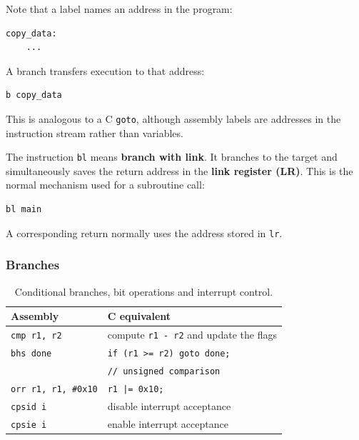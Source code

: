 \documentclass[a4paper,11pt]{article}
\begin{document}
Note that a label names an address in the program:

\begin{lstlisting}[language=arm]
copy_data:
    ...
\end{lstlisting}

A branch transfers execution to that address:

\begin{lstlisting}[language=arm]
b copy_data
\end{lstlisting}

This is analogous to a C \texttt{goto}, although assembly labels are
addresses in the instruction stream rather than variables.

The instruction \texttt{bl} means \textbf{branch with link}. It branches to
the target and simultaneously saves the return address in the
\textbf{link register (LR)}. This is the normal mechanism used for a
subroutine call:

\begin{lstlisting}[language=arm]
bl main
\end{lstlisting}

A corresponding return normally uses the address stored in \texttt{lr}.

\subsubsection{Branches}

\begin{table}[ht]
	\centering
	\begin{tabular}{ll}
		\hline
		Assembly                    & C equivalent                    \\
		\hline
		\texttt{cmp r1, r2}         &
		compute \texttt{r1 - r2} and update the flags                 \\

		\texttt{bhs done}           &
		\texttt{if (r1 >= r2) goto done;}                             \\
		                            & \texttt{// unsigned comparison} \\

		\texttt{orr r1, r1, \#0x10} &
		\texttt{r1 |= 0x10;}                                          \\

		\texttt{cpsid i}            &
		disable interrupt acceptance                                  \\

		\texttt{cpsie i}            &
		enable interrupt acceptance                                   \\
		\hline
	\end{tabular}
	\caption{Conditional branches, bit operations and interrupt control.}
	\label{tab:arm-decisions-bits-interrupts}
\end{table}
\end{document}
